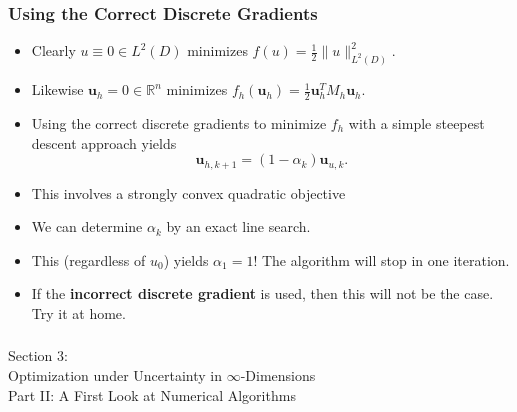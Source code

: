 \documentclass[aspectratio=169,xcolor=dvipsnames,10pt]{beamer}
\begin{document}
\begin{frame}\frametitle{Using the Correct Discrete Gradients}
\begin{example}[Scaling]
\begin{itemize}
\item Clearly $u \equiv 0 \in L^2(D)$ minimizes $f(u) = \frac{1}{2} \| u \|^2_{L^2(D)}$.
\item Likewise 
$\bm u_h = 0 \in \mathbb R^n$ minimizes 
$f_h(\bm u_h) = \frac{1}{2} \bm u_h^T M_h \bm u_h$.
\item Using the correct discrete gradients to minimize $f_h$ with a simple steepest descent approach yields
\[
\bm u_{h,k+1} = (1-\alpha_k) \bm u_{u,k}.
\]
\item  This involves a strongly convex quadratic objective
\item We can determine $\alpha_k$ by an exact line search. 
\item This (regardless of $u_0$) yields $\alpha_1 = 1$!  The algorithm will stop in one iteration.
\item If the \textbf{incorrect discrete gradient} is used, then this will 
\alert{not be the case}. Try it at home.
\end{itemize}
\end{example}
\end{frame}

\begin{frame}\frametitle{}
\begin{center}\Large
Section 3: \\
Optimization under Uncertainty in $\infty$-Dimensions \\
Part II: A First Look at Numerical Algorithms
\end{center}
\end{frame}

\end{document}
